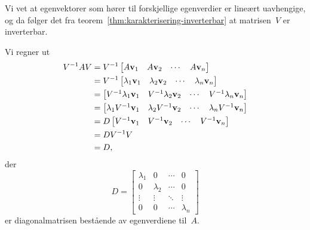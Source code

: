 \begin{losning}
\begin{punkt}
Vi vet at egenvektorer som hører til forskjellige egenverdier er
lineært uavhengige, og da følger det fra
teorem~\ref{thm:karakterisering-inverterbar} at matrisen~$V$ er
inverterbar.
\end{punkt}
\begin{punkt}
Vi regner ut
\begin{align*}
V^{-1} A V
&= V^{-1} \begin{bmatrix} A \mathbf{v}_1 & A \mathbf{v}_2 & \cdots & A \mathbf{v}_n \end{bmatrix} \\
&= V^{-1} \begin{bmatrix} \lambda_1 \mathbf{v}_1 & \lambda_2 \mathbf{v}_2 & \cdots & \lambda_n \mathbf{v}_n \end{bmatrix} \\
&= \begin{bmatrix} V^{-1} \lambda_1 \mathbf{v}_1 & V^{-1} \lambda_2 \mathbf{v}_2 & \cdots & V^{-1} \lambda_n \mathbf{v}_n \end{bmatrix} \\
&= \begin{bmatrix} \lambda_1 V^{-1} \mathbf{v}_1 & \lambda_2 V^{-1} \mathbf{v}_2 & \cdots & \lambda_n V^{-1} \mathbf{v}_n \end{bmatrix} \\
&=
D
\begin{bmatrix} V^{-1} \mathbf{v}_1 & V^{-1} \mathbf{v}_2 & \cdots & V^{-1} \mathbf{v}_n \end{bmatrix} \\
&= D V^{-1} V \\
&= D,
\end{align*}
der
\[
D =
\begin{bmatrix}
\lambda_1 & 0         & \cdots & 0 \\
0         & \lambda_2 & \cdots & 0 \\
\vdots    & \vdots    & \ddots & \vdots \\
0         & 0         & \cdots & \lambda_n
\end{bmatrix}
\]
er diagonalmatrisen bestående av egenverdiene til~$A$.


\end{punkt}
\end{losning}
